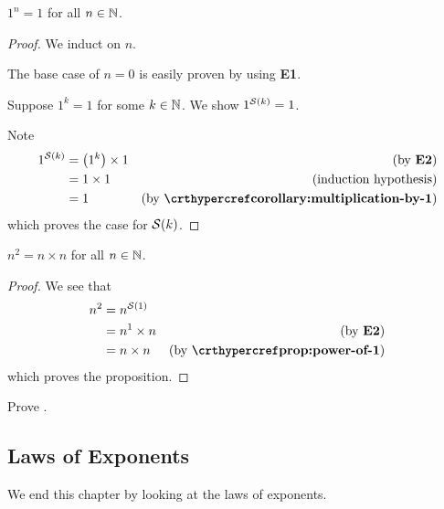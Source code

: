 \begin{proposition}
    $1^n = 1$ for all $n \in \mathbb{N}$.
\end{proposition}
\begin{proof}
    We induct on $n$.

    The base case of $n = 0$ is easily proven by using \textbf{E1}.

    Suppose $1^k = 1$ for some $k \in \mathbb{N}$. We show $1^{\mathcal{S}(k)} = 1$.

    Note
    \begin{align*}
        1^\Successor{k} &= \left(1^k\right) \times 1 & (\text{by \textbf{E2}})\\
        &= 1 \times 1 & (\text{induction hypothesis})\\
        &= 1 & (\text{by \myref{corollary:multiplication-by-1}})
    \end{align*}
    which proves the case for ${\mathcal{S}(k)}$.
\end{proof}

\begin{proposition}[Square]
    $n^2 = n \times n$ for all $n \in \mathbb{N}$.
\end{proposition}
\begin{proof}
    We see that
    \begin{align*}
        n^2 &= n^\Successor{1}\\
        &= n^1 \times n & (\text{by \textbf{E2}})\\
        &= n \times n & (\text{by \myref{prop:power-of-1}})
    \end{align*}
    which proves the proposition.
\end{proof}

\begin{exercise}\label{exercise:power-of-1}
    Prove .
\end{exercise}

\subsection{Laws of Exponents}
We end this chapter by looking at the laws of exponents.

